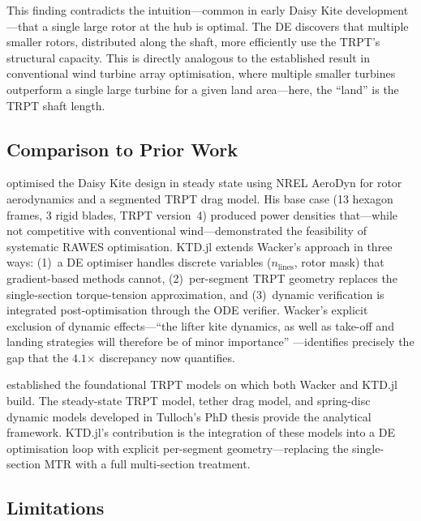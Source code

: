 \documentclass[11pt,a4paper]{article}
\begin{document}
This finding contradicts the intuition—common in early Daisy Kite development—that a single large rotor at the hub is optimal. The DE discovers that multiple smaller rotors, distributed along the shaft, more efficiently use the TRPT's structural capacity. This is directly analogous to the established result in conventional wind turbine array optimisation, where multiple smaller turbines outperform a single large turbine for a given land area—here, the ``land'' is the TRPT shaft length.

\subsection{Comparison to Prior Work}

\cite{wacker2022} optimised the Daisy Kite design in steady state using NREL AeroDyn for rotor aerodynamics and a segmented TRPT drag model. His base case (13 hexagon frames, 3 rigid blades, TRPT version~4) produced power densities that—while not competitive with conventional wind—demonstrated the feasibility of systematic RAWES optimisation. KTD.jl extends Wacker's approach in three ways: (1)~a DE optimiser handles discrete variables ($n_{\mathrm{lines}}$, rotor mask) that gradient-based methods cannot, (2)~per-segment TRPT geometry replaces the single-section torque-tension approximation, and (3)~dynamic verification is integrated post-optimisation through the ODE verifier. Wacker's explicit exclusion of dynamic effects—``the lifter kite dynamics, as well as take-off and landing strategies will therefore be of minor importance'' \cite{wacker2022}—identifies precisely the gap that the $4.1$$\times$ discrepancy now quantifies.

\cite{tulloch2021,tulloch2023} established the foundational TRPT models on which both Wacker and KTD.jl build. The steady-state TRPT model, tether drag model, and spring-disc dynamic models developed in Tulloch's PhD thesis provide the analytical framework. KTD.jl's contribution is the integration of these models into a DE optimisation loop with explicit per-segment geometry—replacing the single-section MTR with a full multi-section treatment.

\subsection{Limitations}
\end{document}
